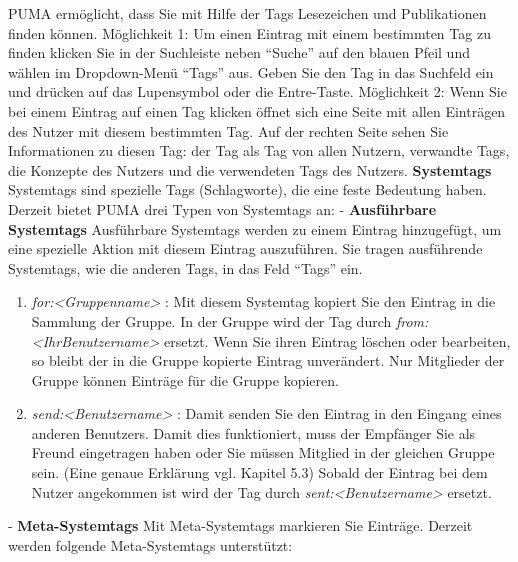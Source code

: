 \documentclass[a4paper,11pt,twoside]{scrbook}
\begin{document}
PUMA ermöglicht, dass Sie mit Hilfe der Tags Lesezeichen und Publikationen finden können. \newline
Möglichkeit 1: Um einen Eintrag mit einem bestimmten Tag zu finden klicken Sie in der Suchleiste neben \enquote{Suche} auf den blauen Pfeil und wählen im Dropdown-Menü \enquote{Tags} aus. Geben Sie den Tag in das Suchfeld ein und drücken auf das Lupensymbol oder die Entre-Taste.\newline
Möglichkeit 2: Wenn Sie bei einem Eintrag auf einen Tag klicken öffnet sich eine Seite mit allen Einträgen des Nutzer mit diesem bestimmten Tag. Auf der rechten Seite sehen Sie Informationen zu diesen Tag: der Tag als Tag von allen Nutzern, verwandte Tags, die Konzepte des Nutzers und die verwendeten Tags des Nutzers. 
\newline
\newline
\textbf{Systemtags}
\newline
Systemtags sind spezielle Tags (Schlagworte), die eine feste Bedeutung haben. Derzeit bietet PUMA drei Typen von Systemtags an: \newline\newline
- \textbf{Ausführbare Systemtags}\newline
Ausführbare Systemtags werden zu einem Eintrag hinzugefügt, um eine spezielle Aktion mit diesem Eintrag auszuführen. Sie tragen ausführende Systemtags, wie die anderen Tags, in das Feld \enquote{Tags} ein. 
\begin{enumerate}
    \item \textit{for:<Gruppenname>} : Mit diesem Systemtag kopiert Sie den Eintrag in die Sammlung der Gruppe. In der Gruppe wird der Tag durch \textit{from:<IhrBenutzername>} ersetzt. Wenn Sie ihren Eintrag löschen oder bearbeiten, so bleibt der in die Gruppe kopierte Eintrag unverändert. Nur Mitglieder der Gruppe können Einträge für die Gruppe kopieren.
    \item \textit{send:<Benutzername>} : Damit senden Sie den Eintrag in den Eingang eines anderen Benutzers. Damit dies funktioniert, muss der Empfänger Sie als Freund eingetragen haben oder Sie müssen Mitglied in der gleichen Gruppe sein. (Eine genaue Erklärung vgl. Kapitel 5.3) Sobald der Eintrag bei dem Nutzer angekommen ist wird der Tag durch \textit{sent:<Benutzername>} ersetzt.
\end{enumerate}
- \textbf{Meta-Systemtags}
\newline   
Mit Meta-Systemtags markieren Sie Einträge. Derzeit werden folgende Meta-Systemtags unterstützt:
\end{document}
